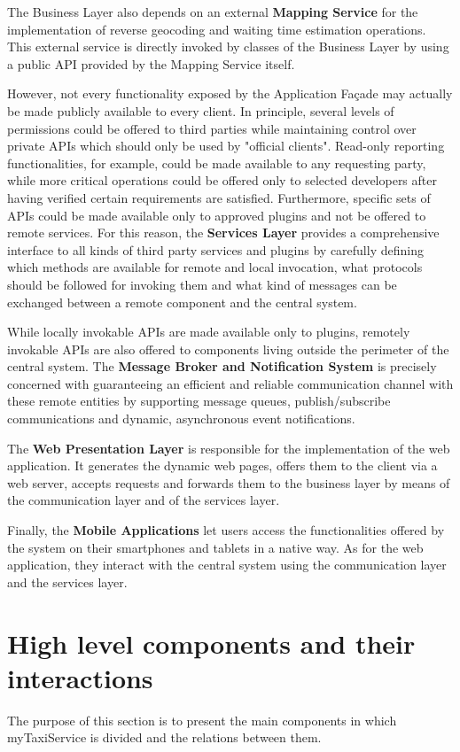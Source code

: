 The Business Layer also depends on an external \textbf{Mapping Service} for the implementation of reverse geocoding and waiting time estimation operations. This external service is directly invoked by classes of the Business Layer by using a public API provided by the Mapping Service itself. 

However, not every functionality exposed by the Application Façade may actually be made publicly available to every client. In principle, several levels of permissions could be offered to third parties while maintaining control over private APIs which should only be used by "official clients". Read-only reporting functionalities, for example, could be made available to any requesting party, while more critical operations could be offered only to selected developers after having verified certain requirements are satisfied. Furthermore, specific sets of APIs could be made available only to approved plugins and not be offered to remote services. For this reason, the \textbf{Services Layer} provides a comprehensive interface to all kinds of third party services and plugins by carefully defining which methods are available for remote and local invocation, what protocols should be followed for invoking them and what kind of messages can be exchanged between a remote component and the central system.

While locally invokable APIs are made available only to plugins, remotely invokable APIs are also offered to components living outside the perimeter of the central system. The \textbf{Message Broker and Notification System} is precisely concerned with guaranteeing an efficient and reliable communication channel with these remote entities by supporting message queues, publish/subscribe communications and dynamic, asynchronous event notifications.

The \textbf{Web Presentation Layer} is responsible for the implementation of the web application. It generates the dynamic web pages, offers them to the client via a web server, accepts requests and forwards them to the business layer by means of the communication layer and of the services layer. 

Finally, the \textbf{Mobile Applications} let users access the functionalities offered by the system on their smartphones and tablets in a native way. As for the web application, they interact with the central system using the communication layer and the services layer.
  
\section{High level components and their interactions}
The purpose of this section is to present the main components in which myTaxiService is divided and the relations between them.

